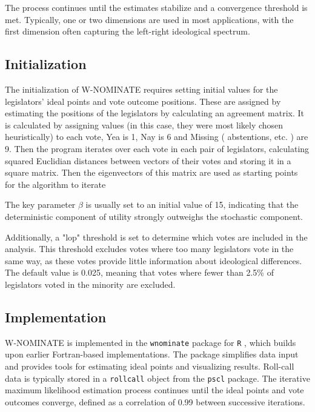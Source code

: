 \documentclass[a4paper,12pt]{report}
\begin{document}
    The process continues until the estimates stabilize and a
    convergence threshold is met. Typically, one or two dimensions are used in most applications, with the
    first dimension often capturing the left-right ideological spectrum.

    \subsection{Initialization}
    The initialization of W-NOMINATE requires setting initial values for the legislators' ideal points and
    vote outcome positions. These are assigned by estimating the positions of
    the legislators by calculating an agreement matrix. It is calculated by assigning values (in this
    case, they were most likely chosen heuristically) to each vote, Yea is 1, Nay is 6 and Missing (
    abstentions, etc. ) are 9. Then the program iterates over each vote in each pair of legislators,
    calculating squared Euclidian distances between vectors of their votes and storing it in a square matrix. Then the
    eigenvectors of this matrix are used as starting points for the algorithm to iterate


    The key parameter \( \beta \) is usually set to an initial value of 15, indicating that the
    deterministic component of utility
    strongly outweighs the stochastic component.

    Additionally, a "lop" threshold is set to determine which votes are included in the analysis.
    This threshold excludes votes where too many legislators vote in the same way, as these votes
    provide little information about ideological differences. The default value is 0.025,
    meaning that votes where fewer than 2.5\% of legislators voted in the minority are excluded.

    \subsection{Implementation}
    W-NOMINATE is implemented in the \texttt{wnominate} package for \texttt{R}
    , which builds upon earlier Fortran-based implementations. The package simplifies data input and
    provides tools for estimating ideal points and visualizing results. Roll-call data is typically
    stored in a \texttt{rollcall} object from the \texttt{pscl}
    package. The iterative maximum likelihood estimation process continues until the ideal points
    and vote outcomes converge, defined as a correlation of 0.99 between successive iterations.
\end{document}
